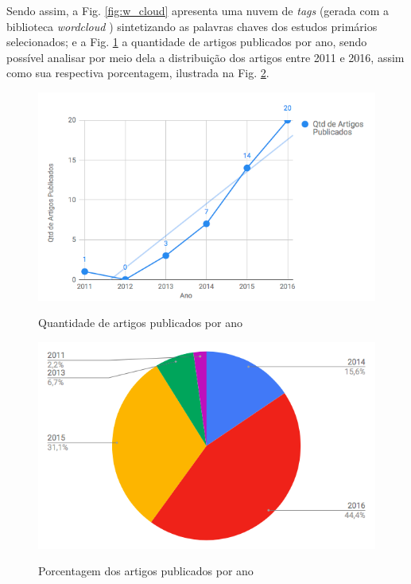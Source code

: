 \documentclass[
	12pt,				%
	oneside,			%
	a4paper,			%
	english,			%
	brazil				%
	]{abntex2ppgsi}
\begin{document}
{{Sendo assim, a Fig. \ref{fig:w_cloud} apresenta uma nuvem de \textit{tags} (gerada com a biblioteca \textit{wordcloud} \cite{wordcloud}) sintetizando as palavras chaves dos estudos primários selecionados; e a Fig. \ref{fig:qtd} a quantidade de artigos publicados por ano, sendo possível analisar por meio dela a distribuição dos artigos entre 2011 e 2016, assim como sua respectiva porcentagem, ilustrada na Fig. \ref{fig:porcentagem}.

\begin{figure}[H]%
	\centering
 	  \caption{Quantidade de artigos publicados por ano}
		\includegraphics[width=0.8\linewidth]{images/g1.png}
	\label{fig:qtd}
\end{figure}

\begin{figure}[H]%
	\centering
 	  \caption{Porcentagem dos artigos publicados por ano}
		\includegraphics[width=0.8\linewidth]{images/g2.png}
	\label{fig:porcentagem}
\end{figure}

}}
\end{document}
